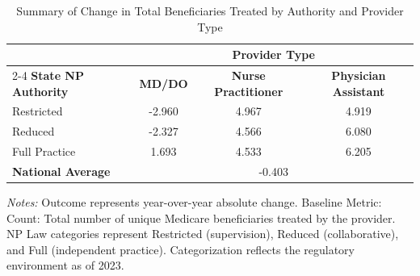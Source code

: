 \begin{table}[htbp]
    \centering
    \caption{Summary of Change in Total Beneficiaries Treated by Authority and Provider Type}
    \label{tab:d_tot_benes_provtype}
    \vspace{0.2cm}
    \begin{tabular}{lccc}
        \toprule
        & \multicolumn{3}{c}{\textbf{Provider Type}} \\
        \cmidrule(lr){2-4}
        \textbf{State NP Authority} & \textbf{MD/DO} & \textbf{Nurse Practitioner} & \textbf{Physician Assistant} \\
        \midrule
        Restricted & -2.960 & 4.967 & 4.919 \\
        Reduced & -2.327 & 4.566 & 6.080 \\
        Full Practice & 1.693 & 4.533 & 6.205 \\
        \midrule
        \textbf{National Average} & \multicolumn{3}{c}{-0.403} \\
        \bottomrule
    \end{tabular}
    \vspace{0.1cm}
    \begin{minipage}{0.85\textwidth}
        \footnotesize \textit{Notes:} Outcome represents year-over-year absolute change. Baseline Metric: Count: Total number of unique Medicare beneficiaries treated by the provider. NP Law categories represent Restricted (supervision), Reduced (collaborative), and Full (independent practice). Categorization reflects the regulatory environment as of 2023.
    \end{minipage}
\end{table}